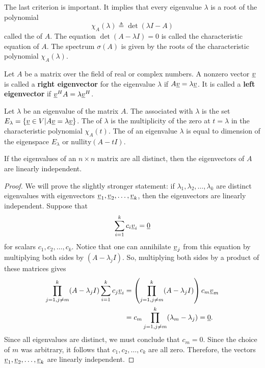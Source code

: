 The last criterion is important.
It implies that every eigenvalue $\lambda$ is a root of the polynomial 
\[ \chi_A (\lambda) \triangleq \det (\lambda I - A) \]
called the  of $A$.
The equation $\det (A - \lambda I) = 0$ is called the characteristic equation of $A$.
The spectrum $\sigma(A)$ is given by the roots of the characteristic polynomial $\chi_A (\lambda)$.

Let $A$ be a matrix over the field of real or complex numbers.
A nonzero vector $\underline{v}$ is called a \textbf{right eigenvector} for the eigenvalue $\lambda$ if $A \underline{v} = \lambda \underline{v}$.
It is called a \textbf{left eigenvector} if $\underline{v}^H A = \lambda \underline{v}^H$.

\begin{definition}
Let $\lambda$ be an eigenvalue of the matrix $A$.
The  associated with $\lambda$ is the set $E_\lambda = \{ \underline{v} \in V | A \underline{v} = \lambda \underline{v} \}$.
The  of $\lambda$ is the multiplicity of the zero at $t=\lambda$ in the characteristic polynomial $\chi_A (t)$.
The  of an eigenvalue $\lambda$ is equal to dimension of the eigenspace $E_\lambda$ or $\textrm{nullity}(A - t I)$.
\end{definition}

\begin{theorem}
If the eigenvalues of an $n \times n$ matrix are all distinct, then the eigenvectors of $A$ are linearly independent.
\end{theorem}
\begin{proof}
We will prove the slightly stronger statement: if $\lambda_1 , \lambda_2 , \ldots, \lambda_k $ are distinct eigenvalues with eigenvectors $\underline{v}_1 , \underline{v}_2 , \ldots, \underline{v}_k$, then the eigenvectors are linearly independent.
Suppose that
\begin{equation*}
\sum_{i=1}^k c_i \underline{v}_i = \underline{0}
\end{equation*}
for scalars $c_1, c_2, \ldots, c_k$.
Notice that one can annihilate $\underline{v}_j$ from this equation by multiplying both sides by $(A-\lambda_j I)$.
So, multiplying both sides by a product of these matrices gives
\begin{align*}
\prod_{j=1,j\neq m}^k (A-\lambda_j I) \sum_{i=1}^k c_j \underline{v}_i
&= \left( \prod_{j=1,j\neq m}^k (A-\lambda_j I) \right) c_m \underline{v}_m \\
&= c_m \prod_{j=1,j\neq m}^k (\lambda_m - \lambda_j) = \underline{0}.
\end{align*}
Since all eigenvalues are distinct, we must conclude that $c_m = 0$.
Since the choice of $m$ was arbitrary, it follows that $c_1,c_2,\ldots,c_k$ are all zero.
Therefore, the vectors $\underline{v}_1 , \underline{v}_2 , \ldots, \underline{v}_k$ are linearly independent.
\end{proof}

